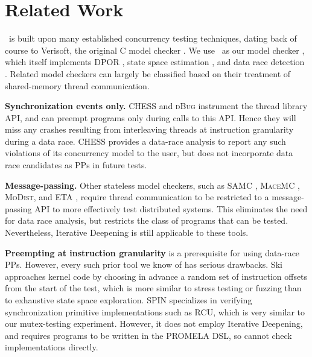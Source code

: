 \section{Related Work}


\quicksand~is built upon many established concurrency testing techniques, dating back of course to Verisoft, the original C model checker \cite{verisoft}.
We use \landslide~as our model checker \cite{landslide},
which itself implements DPOR \cite{dpor},
state space estimation \cite{estimation},
and data race detection \cite{eraser}. Related model checkers can largely be classified based on their treatment of shared-memory thread communication.

{\bf Synchronization events only.} CHESS \cite{chess} and \textsc{dBug} \cite{dbug-ssv} instrument the thread library API, and can preempt programs only during calls to this API.
Hence they will miss any crashes resulting from interleaving threads at instruction granularity during a data race. CHESS provides a data-race analysis to report any such violations of its concurrency model to the user, but does not incorporate data race candidates as PPs in future tests.

{\bf Message-passing.} Other stateless model checkers, such as SAMC \cite{samc}, \textsc{MaceMC} \cite{macemc}, \textsc{MoDist}, and ETA \cite{parallel-dpor}, require thread communication to be restricted to a message-passing API to more effectively test distributed systems.
This eliminates the need for data race analysis, but restricts the class of programs that can be tested.
Nevertheless, Iterative Deepening is still applicable to these tools.

{\bf Preempting at instruction granularity} is a prerequisite for using data-race PPs. However, every such prior tool we know of has serious drawbacks.
Ski \cite{ski} approaches kernel code by choosing in advance a random set of instruction offsets from the start of the test,
which is more similar to stress testing or fuzzing than to exhaustive state space exploration.
SPIN \cite{spin} specializes in verifying synchronization primitive implementations such as RCU, which is very similar to our mutex-testing experiment.
However, it does not employ Iterative Deepening, and requires programs to be written in the PROMELA DSL, so cannot check implementations directly.

